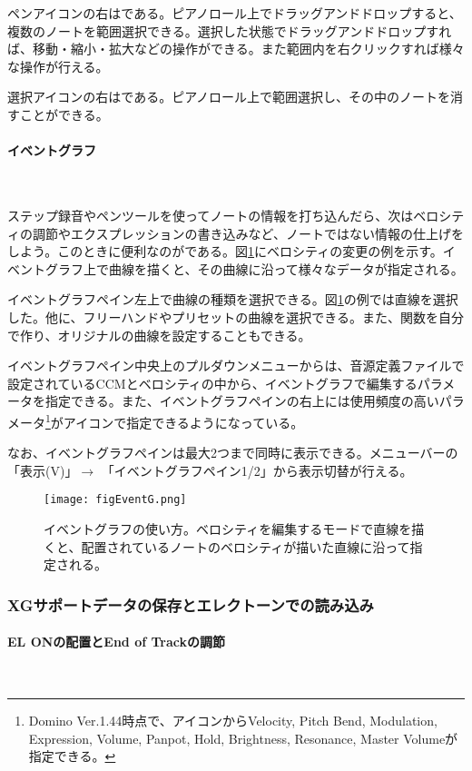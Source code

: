 \documentclass[uplatex, 10pt, dvipdfmx]{jsarticle}
\numberwithin{equation}{section}
\newcommand{\emphj}[1]{\textbf{\textrm{\textgt{{#1}}}}}
\begin{document}
ペンアイコンの右は\emphj{選択ツール}である。ピアノロール上でドラッグアンドドロップすると、複数のノートを範囲選択できる。選択した状態でドラッグアンドドロップすれば、移動・縮小・拡大などの操作ができる。また範囲内を右クリックすれば様々な操作が行える。

選択アイコンの右は\emphj{消しゴムツール}である。ピアノロール上で範囲選択し、その中のノートを消すことができる。

\paragraph{イベントグラフ} \ 

ステップ録音やペンツールを使ってノートの情報を打ち込んだら、次はベロシティの調節やエクスプレッションの書き込みなど、ノートではない情報の仕上げをしよう。このときに便利なのが\emphj{イベントグラフ}である。図\ref{figEventG}にベロシティの変更の例を示す。イベントグラフ上で曲線を描くと、その曲線に沿って様々なデータが指定される。

イベントグラフペイン左上で曲線の種類を選択できる。図\ref{figEventG}の例では直線を選択した。他に、フリーハンドやプリセットの曲線を選択できる。また、関数を自分で作り、オリジナルの曲線を設定することもできる。

イベントグラフペイン中央上のプルダウンメニューからは、音源定義ファイルで設定されているCCMとベロシティの中から、イベントグラフで編集するパラメータを指定できる。また、イベントグラフペインの右上には使用頻度の高いパラメータ\footnote{Domino Ver.1.44時点で、アイコンからVelocity, Pitch Bend, Modulation, Expression, Volume, Panpot, Hold, Brightness, Resonance, Master Volumeが指定できる。}がアイコンで指定できるようになっている。

なお、イベントグラフペインは最大2つまで同時に表示できる。メニューバーの「表示(V)」$\rightarrow$ 「イベントグラフペイン1/2」から表示切替が行える。
\begin{figure}[h]
  \centering
  \texttt{[image: figEventG.png]}
  \caption{イベントグラフの使い方。ベロシティを編集するモードで直線を描くと、配置されているノートのベロシティが描いた直線に沿って指定される。}
  \label{figEventG}
\end{figure}
\clearpage

\subsubsection{XGサポートデータの保存とエレクトーンでの読み込み}
\paragraph{EL ONの配置とEnd of Trackの調節}\
\end{document}
